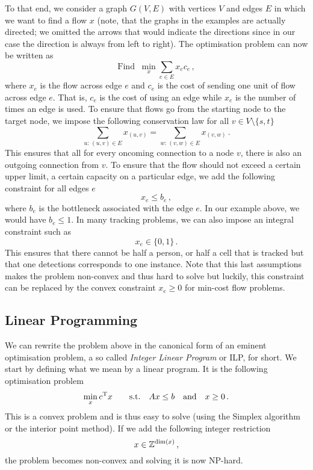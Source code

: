 To that end, we consider a graph $G(V,E)$ with vertices $V$ and edges $E$ in
which we want to find a flow $x$ (note, that the graphs in the examples are
actually directed; we omitted the arrows that would indicate the directions
since in our case the direction is always from left to right). The optimisation
problem can now be written as
\begin{equation*}
  \text{Find }\ \min_x \sum_{e \in E}x_e c_e\,,
\end{equation*}
where $x_e$ is the flow across edge $e$ and $c_e$ is the cost of sending one
unit of flow across edge $e$. That is, $c_e$ is the cost of using an edge while
$x_e$ is the number of times an edge is used. To ensure that flows go from the
starting node to the target node, we impose the following conservation law for
all $v \in V \setminus \{s,t\}$
\begin{equation*}
  \sum_{u:\,(u,v)\in E} x_{(u,v)} =  \sum_{w:\,(v,w)\in E} x_{(v,w)}\,.
\end{equation*}
This ensures that all for every oncoming connection to a node $v$, there is also
an outgoing connection from $v$. To ensure that the flow should not exceed a
certain upper limit, \ie a certain capacity on a particular edge, we add the
following constraint for all edges $e$
\begin{equation*}
  x_e \le b_e\,,
\end{equation*}
where $b_e$ is the bottleneck associated with the edge $e$. In our example
above, we would have $b_e \le 1$. In many tracking problems, we can also impose
an integral constraint such as
\begin{equation*}
  x_e \in \{0,1\}\,.
\end{equation*}
This ensures that there cannot be half a person, or half a cell that is tracked
but that one detections corresponds to one instance. Note that this last
assumptions makes the problem non-convex and thus hard to solve but luckily,
this constraint can be replaced by the convex constraint $x_e \ge 0$ for
min-cost flow problems.

\subsection*{Linear Programming}
We can rewrite the problem above in the canonical form of an eminent
optimisation problem, a so called \emph{Integer Linear Program} or ILP, for
short. We start by defining what we mean by a linear program. It is the
following optimisation problem
\begin{equation*}
  \min_x c^{\mathrm{T}} x \qquad \text{s.t.}\quad Ax \le b \quad \text{and}\quad x\ge 0\,.
\end{equation*}
This is a convex problem and is thus easy to solve (using the Simplex algorithm
or the interior point method). If we add the following integer restriction
\begin{equation*}
  x \in \mathbb{Z}^{\dim(x)}\,,
\end{equation*}
the problem becomes non-convex and solving it is now NP-hard.

